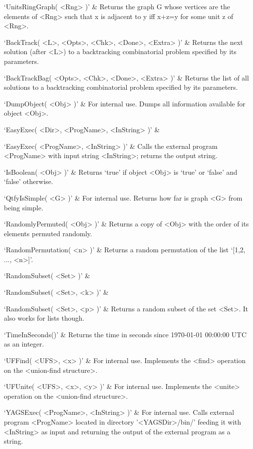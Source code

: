 `UnitsRingGraph( <Rng> )' & 
Returns  the graph G whose vertices are the elements of <Rng>  such that x
is adjacent to y iff x+z=y for some unit z of <Rng>.
\enditems


\beginitems
`BackTrack( <L>, <Opts>, <Chk>, <Done>, <Extra> )' & 
Returns the next solution (after <L>) to a backtracking combinatorial problem specified by its parameters.

`BackTrackBag( <Opts>, <Chk>, <Done>, <Extra> )' & 
Returns the list of all solutions to a backtracking combinatorial problem specified by its parameters.
\enditems


\beginitems
`DumpObject( <Obj> )' & 
For internal use. Dumps  all information available for object <Obj>.

`EasyExec( <Dir>, <ProgName>, <InString> )' & 

`EasyExec( <ProgName>, <InString> )' & 
Calls the external program <ProgName> with input string <InString>; returns the output string.

`IsBoolean( <Obj> )' & 
Returns `true' if object <Obj> is `true' or `false' and `false' otherwise.

`QtfyIsSimple( <G> )' & 
For internal use. Returns how far is graph <G> from being simple.

`RandomlyPermuted( <Obj> )' & 
Returns  a copy of <Obj> with the order of its elements permuted randomly.

`RandomPermutation( <n> )' & 
Returns a random permutation of the list `[1,2, ..., <n>]'.

`RandomSubset( <Set> )' &

`RandomSubset( <Set>, <k> )' &

`RandomSubset( <Set>, <p> )' &
Returns a random subset of the set <Set>. It also works for lists though.

`TimeInSeconds()' & 
Returns the time in seconds since 1970-01-01 00:00:00 UTC as an integer.

`UFFind( <UFS>, <x> )' & 
For  internal  use.  Implements  the  <find>  operation on the <union-find structure>. 

`UFUnite( <UFS>, <x>, <y> )' & 
For  internal  use.  Implements  the  <unite> operation on the <union-find structure>.

`YAGSExec( <ProgName>, <InString> )' & 
For  internal  use.  Calls  external  program  <ProgName> located in directory
'<YAGSDir>/bin/'  feeding  it with <InString> as input and returning  the
output  of  the  external  program  as a string.
\enditems

